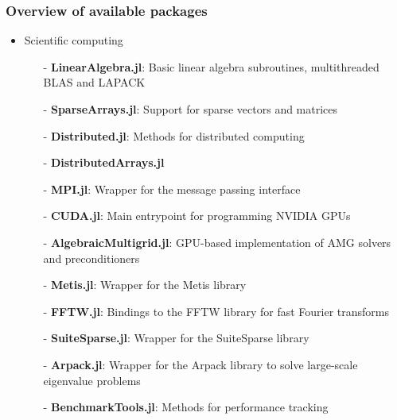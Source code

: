 \documentclass[t,usepdftitle=false]{beamer}
\begin{document}
\begin{frame}
	\frametitle{Overview of available packages}
	\begin{itemize}
		\item Scientific computing
		\begin{itemize}\normalsize
			\item[-] \textbf{LinearAlgebra.jl}: Basic linear algebra subroutines, multithreaded BLAS and LAPACK
			\vspace{.05cm}
			\item[-] \textbf{SparseArrays.jl}: Support for sparse vectors and matrices
			\vspace{.05cm}
			\item[-] \textbf{Distributed.jl}: Methods for distributed computing
			\vspace{.05cm}
			\item[-] \textbf{DistributedArrays.jl}
			\vspace{.05cm}
			\item[-] \textbf{MPI.jl}: Wrapper for the message passing interface
			\vspace{.05cm}
			\item[-] \textbf{CUDA.jl}: Main entrypoint for programming NVIDIA GPUs
			\vspace{.05cm}
			\item[-] \textbf{AlgebraicMultigrid.jl}: GPU-based implementation of AMG solvers and preconditioners
			\vspace{.05cm}
			\item[-] \textbf{Metis.jl}: Wrapper for the Metis library
			\vspace{.05cm}
			\item[-] \textbf{FFTW.jl}: Bindings to the FFTW library for fast Fourier transforms
			\vspace{.05cm}
			\item[-] \textbf{SuiteSparse.jl}: Wrapper for the SuiteSparse library
			\vspace{.05cm}
			\item[-] \textbf{Arpack.jl}: Wrapper for the Arpack library to solve large-scale eigenvalue problems
			\vspace{.05cm}
			\item[-] \textbf{BenchmarkTools.jl}: Methods for performance tracking
		\end{itemize}
	\end{itemize}
\end{frame}  
\end{document}
